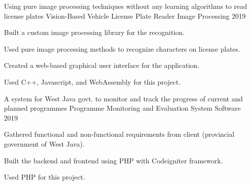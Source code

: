 \begin{cventries}
    \cventry
    {Using pure image processing techniques without any learning algorithms to read license plates} %
    {Vision-Based Vehicle License Plate Reader} %
    {Image Processing} %
    {2019} %
    {
        \begin{cvitems} %
            \item {Built a custom image processing library for the recognition.}
            \item {Used pure image processing methods to recognize characters on license plates.}
            \item {Created a web-based graphical user interface for the application.}
            \item {Used C++, Javascript, and WebAssembly for this project.}
        \end{cvitems}
    }
    
    \cventry
        {A system for West Java govt. to monitor and track the progress of current and planned programmes} %
        {Programme Monitoring and Evaluation System} %
        {Software} %
        {2019} %
        {
            \begin{cvitems} %
            	\item {Gathered functional and non-functional requirements from client (provincial government of West Java).}
                \item {Built the backend and frontend using PHP with Codeigniter framework.}
                \item {Used PHP for this project.}
            \end{cvitems}
        }

    
\end{cventries}
